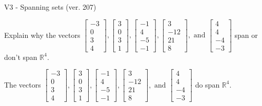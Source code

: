 \begin{exercise}
  \begin{exerciseTitle}V3 - Spanning sets (ver. 207)\end{exerciseTitle}
  \begin{exerciseStatement}
    Explain why the vectors \(\left[\begin{array}{r}
-3 \\
0 \\
3 \\
4
\end{array}\right] , \left[\begin{array}{r}
3 \\
0 \\
3 \\
1
\end{array}\right] , \left[\begin{array}{r}
-1 \\
4 \\
-5 \\
-1
\end{array}\right] , \left[\begin{array}{r}
3 \\
-12 \\
21 \\
8
\end{array}\right] , \text{ and } \left[\begin{array}{r}
4 \\
4 \\
-4 \\
-3
\end{array}\right]\) span or don't span \(\mathbb{R}^4\). 
	


  \end{exerciseStatement}
  \begin{exerciseAnswer}
   The vectors \(\left[\begin{array}{r}
-3 \\
0 \\
3 \\
4
\end{array}\right] , \left[\begin{array}{r}
3 \\
0 \\
3 \\
1
\end{array}\right] , \left[\begin{array}{r}
-1 \\
4 \\
-5 \\
-1
\end{array}\right] , \left[\begin{array}{r}
3 \\
-12 \\
21 \\
8
\end{array}\right] , \text{ and } \left[\begin{array}{r}
4 \\
4 \\
-4 \\
-3
\end{array}\right]\) 
  	 do  
	span \(\mathbb{R}^4\).
  



\end{exerciseAnswer}
\end{exercise}
